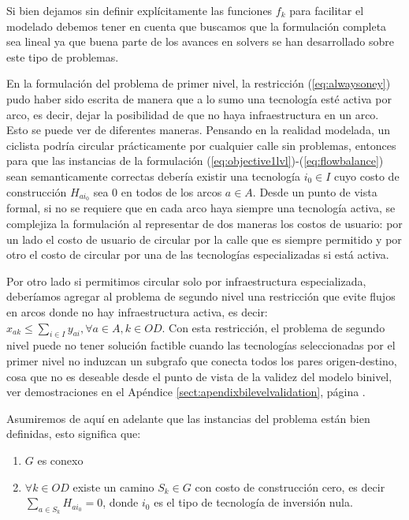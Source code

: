
Si bien dejamos sin definir explícitamente las funciones $f_k$ para facilitar el modelado debemos tener en cuenta que buscamos que la formulación completa sea lineal ya que buena parte de los avances en solvers se han desarrollado sobre este tipo de problemas.

En la formulación del problema de primer nivel, la restricción (\ref{eq:alwaysoney}) pudo haber sido escrita de manera que a lo sumo una tecnología esté activa por arco, es decir, dejar la posibilidad de que no haya infraestructura en un arco. Esto se puede ver de diferentes maneras. Pensando en la realidad modelada, un ciclista podría circular prácticamente por cualquier calle sin problemas, entonces para que las instancias de la formulación (\ref{eq:objective1lvl})-(\ref{eq:flowbalance}) sean semanticamente correctas debería existir una tecnología $i_0 \in I$ cuyo costo de construcción $H_{ai_0}$ sea 0 en todos de los arcos $a \in A$. Desde un punto de vista formal, si no se requiere que en cada arco haya siempre una tecnología activa, se complejiza la formulación al representar de dos maneras los costos de usuario: por un lado el costo de usuario de circular por la calle que es siempre permitido y por otro el costo de circular por una de las tecnologías especializadas si está activa.

Por otro lado si permitimos circular solo por infraestructura especializada, deberíamos agregar al problema de segundo nivel una restricción que evite flujos en arcos donde no hay infraestructura activa, es decir: $x_{ak} \leq \sum_{i \in I} y_{ai}, \forall a \in A, k \in OD$. Con esta restricción, el problema de segundo nivel puede no tener solución factible cuando las tecnologías seleccionadas por el primer nivel no induzcan un subgrafo que conecta todos los pares origen-destino, cosa que no es deseable desde el punto de vista de la validez del modelo binivel, ver demostraciones en el Apéndice \ref{sect:apendixbilevelvalidation}, página \pageref{sect:apendixbilevelvalidation}.

Asumiremos de aquí en adelante que las instancias del problema están bien definidas, esto significa que:

\begin{enumerate}
  \item {$G$ es conexo}
  \item {$\forall k \in OD$ existe un camino $S_k \in G$ con costo de construcción cero, es decir $\sum_{a \in S_k} H_{ai_0} = 0$}, donde $i_0$ es el tipo de tecnología de inversión nula.
\end{enumerate}


